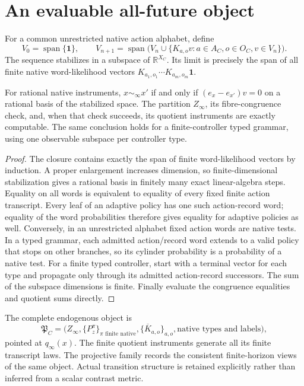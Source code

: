 \section{An evaluable all-future object}
\label{sec:spc2-finite-evaluation}
For a common unrestricted native action alphabet, define
\[
 V_0=\operatorname{span}\{\mathbf1\},\qquad
 V_{n+1}=\operatorname{span}\bigl(V_n\cup
       \{K_{a,o}v:a\in A_C,o\in O_C,v\in V_n\}\bigr).
\]
The sequence stabilizes in a subspace of $\mathbb R^{X_C}$. Its
limit is precisely the span of all finite native word-likelihood
vectors $K_{a_1,o_1}\cdots K_{a_m,o_m}\mathbf1$.

\begin{proposition}
\label{prop:spc2-span-test}
For rational native instruments, $x\sim_\infty x'$ if and only if
$(e_x-e_{x'})v=0$ on a rational basis of the stabilized space. The
partition $Z_\infty$, its fibre-congruence check, and, when that
check succeeds, its quotient instruments are exactly computable.
The same conclusion holds for a finite-controller typed grammar,
using one observable subspace per controller type.
\end{proposition}
\begin{proof}
The closure contains exactly the span of finite word-likelihood
vectors by induction. A proper enlargement increases dimension, so
finite-dimensional stabilization gives a rational basis in finitely
many exact linear-algebra steps. Equality on all words is equivalent
to equality of every fixed finite action transcript. Every leaf of
an adaptive policy has one such action-record word; equality of the
word probabilities therefore gives equality for adaptive policies as
well. Conversely, in an unrestricted alphabet fixed action words are native tests. In a typed grammar, each admitted action/record word extends to a valid policy that stops on other branches, so its cylinder probability is a probability of a native test. For
a finite typed controller, start with a terminal vector for each type
and propagate only through its admitted action-record successors.
The sum of the subspace dimensions is finite. Finally evaluate the
congruence equalities and quotient sums directly.
\end{proof}

The complete endogenous object is
\[
 \mathfrak P_C=
 \bigl(Z_\infty,\{P_z^\pi\}_{\pi\text{ finite native}},
       \{\overline K_{a,o}\}_{a,o},\text{native types and labels}\bigr),
\]
pointed at $q_\infty(x)$. The finite quotient instruments generate
all its finite transcript laws. The projective family records the
consistent finite-horizon views of the same object. Actual transition
structure is retained explicitly rather than inferred from a scalar
contrast metric.

